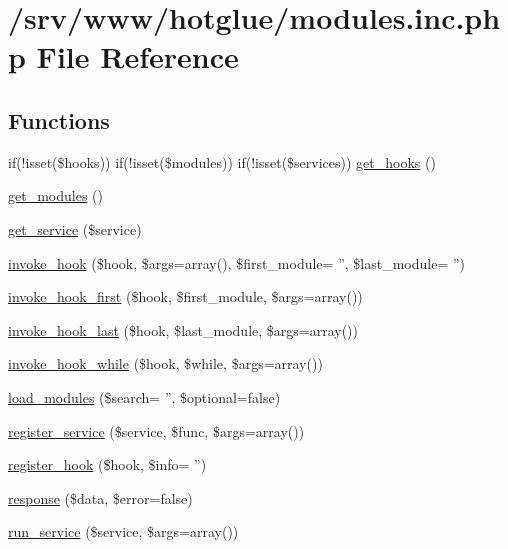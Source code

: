 \hypertarget{modules_8inc_8php}{
\section{/srv/www/hotglue/modules.inc.php File Reference}
\label{modules_8inc_8php}
}
\subsection*{Functions}
\begin{DoxyCompactItemize}
\item 
if(!isset(\$hooks)) if(!isset(\$modules)) if(!isset(\$services)) \hyperlink{modules_8inc_8php_adcaa12e356133b7fa0670571698b38cc}{get\_\-hooks} ()
\item 
\hyperlink{modules_8inc_8php_a1b73e435e11b07906d0781b146b4aa21}{get\_\-modules} ()
\item 
\hyperlink{modules_8inc_8php_abf7633223c2fd4ecb199a8e0dc070802}{get\_\-service} (\$service)
\item 
\hyperlink{modules_8inc_8php_a92ef7c094f294cfec43a3bb53227a21a}{invoke\_\-hook} (\$hook, \$args=array(), \$first\_\-module= '', \$last\_\-module= '')
\item 
\hyperlink{modules_8inc_8php_acac937809bdb98ce29616134e43050ed}{invoke\_\-hook\_\-first} (\$hook, \$first\_\-module, \$args=array())
\item 
\hyperlink{modules_8inc_8php_ae1ff036fae9d272fe1d58dff8a9caed2}{invoke\_\-hook\_\-last} (\$hook, \$last\_\-module, \$args=array())
\item 
\hyperlink{modules_8inc_8php_a66473fc9f24153d85053f1f9c6ed83e4}{invoke\_\-hook\_\-while} (\$hook, \$while, \$args=array())
\item 
\hyperlink{modules_8inc_8php_a23f8be02dc2148a3c860119a1d6ea276}{load\_\-modules} (\$search= '', \$optional=false)
\item 
\hyperlink{modules_8inc_8php_ae6ed600fb2ce39a4b0837bbb01fe8d6e}{register\_\-service} (\$service, \$func, \$args=array())
\item 
\hyperlink{modules_8inc_8php_ad91a5f96df0655d782404170324e567d}{register\_\-hook} (\$hook, \$info= '')
\item 
\hyperlink{modules_8inc_8php_a361058ff2a03c098045c4442440a2574}{response} (\$data, \$error=false)
\item 
\hyperlink{modules_8inc_8php_a3d581f1636df2e24ffe7b013a12fb1db}{run\_\-service} (\$service, \$args=array())
\end{DoxyCompactItemize}



